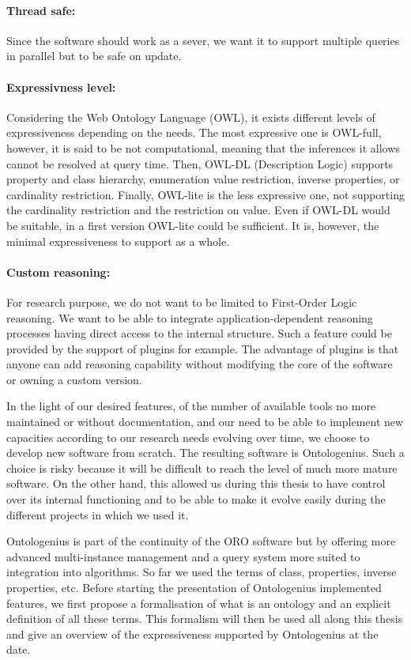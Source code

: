 \paragraph{Thread safe:} Since the software should work as a sever, we want it to support multiple queries in parallel but to be safe on update.

\paragraph{Expressivness level:} Considering the Web Ontology Language (OWL), it exists different levels of expressiveness depending on the needs. The most expressive one is OWL-full, however, it is said to be not computational, meaning that the inferences it allows cannot be resolved at query time. Then, OWL-DL (Description Logic) supports property and class hierarchy, enumeration value restriction, inverse properties, or cardinality restriction. Finally, OWL-lite is the less expressive one, not supporting the cardinality restriction and the restriction on value. Even if OWL-DL would be suitable, in a first version OWL-lite could be sufficient. It is, however, the minimal expressiveness to support as a whole.

\paragraph{Custom reasoning:} For research purpose, we do not want to be limited to First-Order Logic reasoning. We want to be able to integrate application-dependent reasoning processes having direct access to the internal structure. Such a feature could be provided by the support of plugins for example. The advantage of plugins is that anyone can add reasoning capability without modifying the core of the software or owning a custom version.

In the light of our desired features, of the number of available tools no more maintained or without documentation, and our need to be able to implement new capacities according to our research needs evolving over time, we choose to develop new software from scratch. The resulting software is Ontologenius. Such a choice is risky because it will be difficult to reach the level of much more mature software. On the other hand, this allowed us during this thesis to have control over its internal functioning and to be able to make it evolve easily during the different projects in which we used it.

Ontologenius is part of the continuity of the ORO software but by offering more advanced multi-instance management and a query system more suited to integration into algorithms. So far we used the terms of class, properties, inverse properties, etc. Before starting the presentation of Ontologenius implemented features, we first propose a formalisation of what is an ontology and an explicit definition of all these terms. This formalism will then be used all along this thesis and give an overview of the expressiveness supported by Ontologenius at the date.

